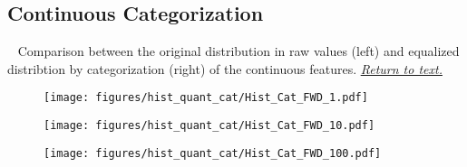 \newpage
\subsection{Continuous Categorization}
~\label{sec:Appendix_Data:sub:Categorization}
Comparison between the original distribution in raw values (left) and equalized distribtion by categorization (right) of the continuous features.
\hyperref[Artificial_Categorisation]{\textit{Return to text.}}

\begin{multicols}{3}
\begin{minipage}{\columnwidth}
    \begin{figure}[H]
        \texttt{[image: figures/hist\_quant\_cat/Hist\_Cat\_FWD\_1.pdf]}
    \end{figure} 
\end{minipage}

\begin{minipage}{\columnwidth}
    \begin{figure}[H]
        \texttt{[image: figures/hist\_quant\_cat/Hist\_Cat\_FWD\_10.pdf]}
    \end{figure} 
\end{minipage}

\begin{minipage}{\columnwidth}
    \begin{figure}[H]
        \hspace{0.8cm}\centering
        \texttt{[image: figures/hist\_quant\_cat/Hist\_Cat\_FWD\_100.pdf]}
    \end{figure} 
\end{minipage}

\end{multicols}

